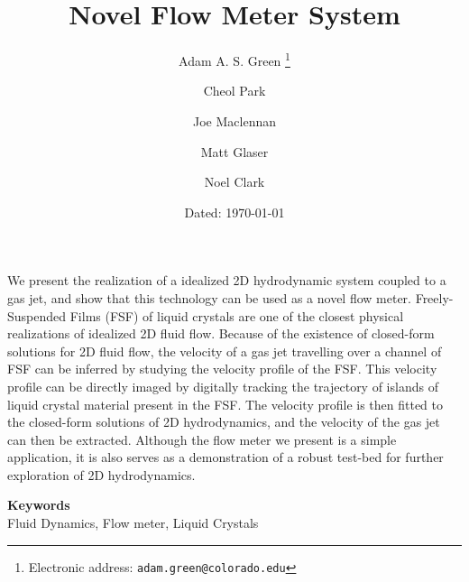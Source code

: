 \documentclass{article} %
\date{} %
\def\keywords#1{\begin{center}{\bf Keywords}\\{#1}\end{center}} %
\begin{document}
\title{Novel Flow Meter System}

\author{Adam A. S. Green%
\thanks{Electronic address: \texttt{adam.green@colorado.edu}}}
\author{Cheol Park}
\author{Joe Maclennan}
\author{Matt Glaser}
\author{Noel Clark}

 
\date{Dated: \today}

\maketitle

\thispagestyle{empty}



\begin{doublespace}
\noindent We present the realization of a idealized 2D hydrodynamic system
coupled to a
gas jet, and show that this technology can be used as a novel flow meter.
Freely-Suspended Films (FSF) of liquid crystals are one of the closest physical realizations of
idealized 2D fluid flow. Because of the  existence of closed-form solutions for 2D
fluid flow, the velocity of a gas jet travelling over a channel of FSF can be
inferred by studying the velocity profile of the FSF. This velocity profile can be
directly imaged by digitally tracking the trajectory of islands of liquid
crystal material present in the FSF. The velocity profile is then fitted to the
closed-form solutions of 2D hydrodynamics, and the velocity of the gas jet can
then be extracted. Although the flow meter we present is a simple
application, it is also serves as a demonstration
of a robust test-bed for further exploration of 2D hydrodynamics.
\end{doublespace}
\vspace{20 mm}
\keywords{Fluid Dynamics, Flow meter, Liquid Crystals} %




                    
\end{document}
